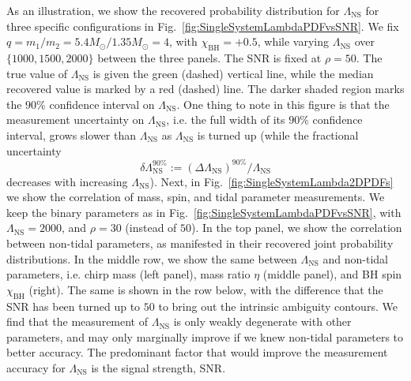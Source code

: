 \documentclass[aps,prd,amsmath,floats,floatfix, twocolumn,
superscriptaddress,nofootinbib,showpacs]{revtex4-1}
\newcommand{\red}{\textcolor{red}}
\newcommand{\lambdans}{\Lambda_\mathrm{NS}}
\newcommand{\chibh}{\chi_\mathrm{BH}}
\begin{document}
As an illustration, we show the recovered
probability distribution for $\lambdans$ for three specific configurations in 
Fig.~\ref{fig:SingleSystemLambdaPDFvsSNR}. We fix $q = m_1/m_2 =
5.4M_\odot/1.35M_\odot = 4$, with $\chibh=+0.5$, while varying $\lambdans$
over $\{1000, 1500, 2000\}$ between the three panels. The SNR is fixed at $\rho=50$.
The true value of $\lambdans$ is given the green (dashed) vertical line,
while the median recovered value is marked by a red (dashed) line. The darker
shaded region marks the $90\%$ confidence interval on $\lambdans$. One thing
to note in this figure is that the measurement uncertainty on $\lambdans$, i.e.
the full width of its $90\%$ confidence interval, grows slower than $\lambdans$
as $\lambdans$ is turned up (while the fractional uncertainty
\begin{equation}
\delta\lambdans^{90\%}:= (\Delta\lambdans)^{90\%}/\lambdans
\end{equation}
decreases with increasing $\lambdans$).
%
Next, in Fig.~\ref{fig:SingleSystemLambda2DPDFs} we show the correlation of
mass, spin, and tidal parameter measurements. We keep the binary parameters
as in Fig.~\ref{fig:SingleSystemLambdaPDFvsSNR}, with $\lambdans=2000$, and
$\rho=30$ (instead of $50$). In the top panel, we show the correlation between
non-tidal parameters, as manifested in their recovered joint probability
distributions.
In the middle row, we show the same between $\lambdans$ and non-tidal 
parameters, i.e. chirp mass (left panel), mass ratio $\eta$ (middle panel), and
BH spin $\chibh$ (right). The same is shown in the row below, with the
difference that the SNR has been turned up to $50$ to bring out the intrinsic
ambiguity contours.
%
We find that the measurement of $\lambdans$ is only weakly degenerate with
other parameters, and may only marginally improve if we knew non-tidal parameters
to better accuracy. The predominant factor that would improve the measurement
accuracy for $\lambdans$ is the signal strength, SNR.









\end{document}
